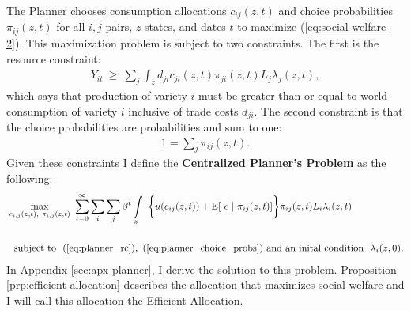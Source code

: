 \documentclass[12pt,pdftex]{article}
\begin{document}
\begin{onehalfspacing}
The Planner chooses consumption allocations $c_{ij}(z, t)$ and choice probabilities $\pi_{ij}(z,t)$ for all $i,j$ pairs, $z$ states, and dates $t$ to maximize (\ref{eq:social-welfare-2}). This maximization problem is subject to two constraints. The first is the resource constraint:
\begin{align}
Y_{it} \  \geq \ \sum_{j} \int_{z} d_{ji} c_{ji}(z, t) \pi_{ji}(z,t) L_{j}\lambda_{j}(z, t),
\label{eq:planner_rc}
\end{align}
which says that production of variety $i$ must be greater than or equal to world consumption of variety $i$ inclusive of trade costs $d_{ji}$. The second constraint is that the choice probabilities are probabilities and sum to one:
\begin{align}
1 = \sum_{j}\pi_{ij}(z,t).
\label{eq:planner_choice_probs}
\end{align}
Given these constraints I define the \textbf{Centralized Planner's Problem} as the following:
\begin{align}
&\max\limits_{c_{i,j}(z, t),\ \pi_{i,j}(z, t)} \ \sum_{t=0}^{\infty}  \sum_{i} \sum_{j} \beta^{t} \int\limits_{z}   \  \bigg \{  u(c_{ij}(z, t) ) + \mathrm{E}[ \ \epsilon \ | \ \pi_{ij}(z,t) ] \bigg \}\pi_{ij}(z,t) L_{i} \lambda_{i}(z, t) \ \ \label{eq:planner_problem}\\
\nonumber \\
& \ \ \mbox{subject to} \ \ (\ref{eq:planner_rc}), \ (\ref{eq:planner_choice_probs}) \ \mbox{and an inital condition} \ \ \lambda_i(z, 0).
\end{align}
In Appendix \ref{sec:apx-planner}, I derive the solution to this problem. Proposition \ref{prp:efficient-allocation} describes the allocation that maximizes social welfare and I will call this allocation the Efficient Allocation.


\end{onehalfspacing}
\end{document}
